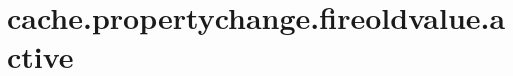 \section{cache.propertychange.fireoldvalue.active}
\label{configuration:CachePropertychangeFireoldvalueActive}
\AvailableInJavaAndCsharp{\TODO}
